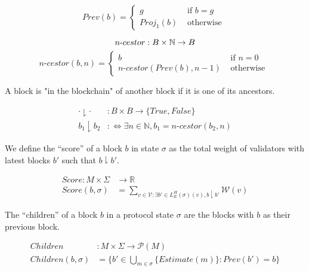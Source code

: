 \[ Prev(b) = \left\{
\begin{array}{ll}
      g& \text{ if $b = g$ } \\
      Proj_1(b)& \text{ otherwise }
\end{array}
\right. \]


\begin{defn}
$$
n\text{-}cestor : B \times \mathbb{N} \to B\\
$$
\[ n\text{-}cestor(b, n) = \left\{
\begin{array}{ll}
      b& \text{ if $n = 0$ } \\
      n\text{-}cestor(Prev(b), n - 1)& \text{ otherwise }
\end{array}
\right. \]
\end{defn}


A block is "in the blockchain" of another block if it is one of its ancestors.

\begin{defn}
\begin{align*}
\cdot \downharpoonright \cdot&: B \times B \to \{True, False\} \\
b_1 \downharpoonright b_2 &:\Leftrightarrow \exists n \in \mathbb{N}, b_1 = n\text{-}cestor(b_2, n)
\end{align*}
\end{defn}

We define the ``score'' of a block $b$ in state $\sigma$ as the total weight of validators with latest blocks $b'$ such that $b \downharpoonright b'$.

\begin{defn}
\begin{align*}
Score: M \times \Sigma &\to \mathbb{R} \\
Score(b, \sigma) &= \sum_{v \in \mathcal{V} : \exists b' \in L^H_E(\sigma)(v), b \downharpoonright b'} \mathcal{W}(v)
\end{align*}
\end{defn}


The ``children'' of a block $b$ in a protocol state $\sigma$ are the blocks with $b$ as their previous block.

\begin{defn}
\begin{align*}
Children&: M \times \Sigma \to \mathcal{P}(M)\\
Children(b,\sigma) &= \{b' \in \bigcup_{m \in \sigma} \{Estimate(m)\} : Prev(b') = b\}
\end{align*}
\end{defn}

